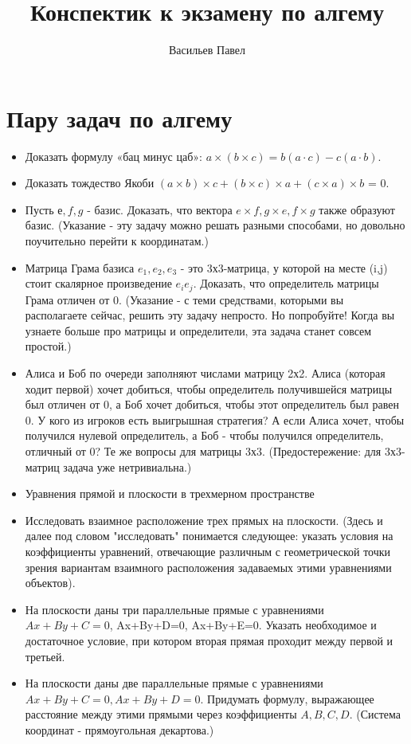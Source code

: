 \documentclass[a4paper]{article}
\title{Конспектик к экзамену по алгему}
\author{Васильев Павел}
\begin{document}
\section*{Пару задач по алгему}

\begin{itemize}


\item Доказать формулу «бац минус цаб»: $a \times (b \times c) = b(a \cdot c) - c(a \cdot b)$.
\item Доказать тождество Якоби $(a \times b) \times c + (b \times c) \times a + (c \times a) \times b$ = 0.
\item Пусть $е, f,g$  - базис. Доказать, что вектора $e \times f, g \times e, f \times g$ также образуют базис. (Указание - эту задачу можно решать разными способами, но довольно поучительно перейти к координатам.)
\item Матрица Грама базиса $e_1,e_2,e_3$ - это 3х3-матрица, у которой на месте (i,j) стоит скалярное произведение $e_ie_j$. Доказать, что определитель матрицы Грама отличен от 0. (Указание - с теми средствами, которыми вы располагаете сейчас, решить эту задачу непросто. Но попробуйте! Когда вы узнаете больше про матрицы и определители, эта задача станет совсем простой.)
\item Алиса и Боб по очереди заполняют числами матрицу 2х2. Алиса (которая ходит первой) хочет добиться, чтобы определитель получившейся матрицы был отличен от 0, а Боб хочет добиться, чтобы этот определитель был равен 0. У кого из игроков есть выигрышная стратегия? А если Алиса хочет, чтобы получился нулевой определитель, а Боб - чтобы получился определитель, отличный от 0? Те же вопросы для матрицы 3х3. (Предостережение: для 3х3-матриц задача уже нетривиальна.)
\item Уравнения прямой и плоскости в трехмерном пространстве
\item Исследовать взаимное расположение трех прямых на плоскости. (Здесь и далее под словом "исследовать" понимается следующее: указать условия на коэффициенты уравнений, отвечающие различным с геометрической точки зрения вариантам взаимного расположения задаваемых этими уравнениями объектов).
\item На плоскости даны три параллельные прямые с уравнениями $Ax+By+C=0$, Ax+By+D=0, Ax+By+E=0. Указать необходимое и достаточное условие, при котором вторая прямая проходит между первой и третьей.
\item На плоскости даны две параллельные прямые с уравнениями $Ax+By+C=0, Ax+By+D=0$. Придумать формулу, выражающее расстояние между этими прямыми через коэффициенты $A,B,C,D$. (Система координат - прямоугольная декартова.)

\end{itemize}
\end{document}
